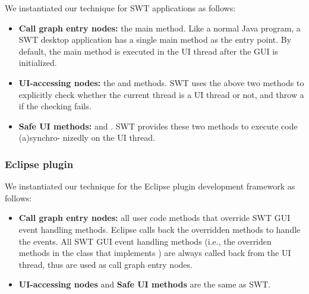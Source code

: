  We instantiated our technique for SWT applications as follows:

\begin{itemize}
\smallstep

\item \textbf{Call graph entry nodes: } the main method. Like a normal Java program,
a SWT desktop application has a single main method as the entry point. By default,
the main method is executed in the UI thread after the GUI
is initialized.

\smallstep

\item \textbf{UI-accessing nodes: } the 
and   methods. SWT uses the above
two methods to explicitly check whether the current thread is a UI thread
or not, and throw a  if the checking fails.
\smallstep

\item \textbf{Safe UI methods: } 
and . SWT provides these two methods
to execute code (a)synchro- nizedly on the UI thread.

\end{itemize}

\subsubsection{Eclipse plugin}

We instantiated our technique for the Eclipse plugin development framework as follows:

\smallstep


\begin{itemize}

\item \textbf{Call graph entry nodes: } all user code methods that override
 SWT GUI event handling methods. Eclipse
calls back the overridden methods to handle the
events. All SWT GUI event handling methods (i.e., the overriden
methods in the class that implements ) are
always called back from the UI thread, thus are used as call graph entry nodes.

\smallstep

\item \textbf{UI-accessing nodes} and \textbf{Safe UI methods} are the same as SWT.

\end{itemize}

